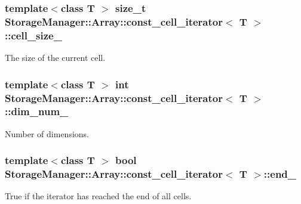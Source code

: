 \subsubsection[{cell\+\_\+size\+\_\+}]{\setlength{\rightskip}{0pt plus 5cm}template$<$class T $>$ size\+\_\+t {\bf Storage\+Manager\+::\+Array\+::const\+\_\+cell\+\_\+iterator}$<$ T $>$\+::cell\+\_\+size\+\_\+\hspace{0.3cm}{\ttfamily [private]}}\label{classStorageManager_1_1Array_1_1const__cell__iterator_afc2fc05f7c8c7eee43136fb7d2a4450b}
The size of the current cell. \hypertarget{classStorageManager_1_1Array_1_1const__cell__iterator_a667e0b16e1df5524fc65f7966d1bc0ba}{}
\subsubsection[{dim\+\_\+num\+\_\+}]{\setlength{\rightskip}{0pt plus 5cm}template$<$class T $>$ int {\bf Storage\+Manager\+::\+Array\+::const\+\_\+cell\+\_\+iterator}$<$ T $>$\+::dim\+\_\+num\+\_\+\hspace{0.3cm}{\ttfamily [private]}}\label{classStorageManager_1_1Array_1_1const__cell__iterator_a667e0b16e1df5524fc65f7966d1bc0ba}
Number of dimensions. \hypertarget{classStorageManager_1_1Array_1_1const__cell__iterator_a3d1517432b22c3446c135510b037ff77}{}
\subsubsection[{end\+\_\+}]{\setlength{\rightskip}{0pt plus 5cm}template$<$class T $>$ bool {\bf Storage\+Manager\+::\+Array\+::const\+\_\+cell\+\_\+iterator}$<$ T $>$\+::end\+\_\+\hspace{0.3cm}{\ttfamily [private]}}\label{classStorageManager_1_1Array_1_1const__cell__iterator_a3d1517432b22c3446c135510b037ff77}
True if the iterator has reached the end of all cells. \hypertarget{classStorageManager_1_1Array_1_1const__cell__iterator_a2cb5d8b4e215896fdd712bc7c263700a}{}
